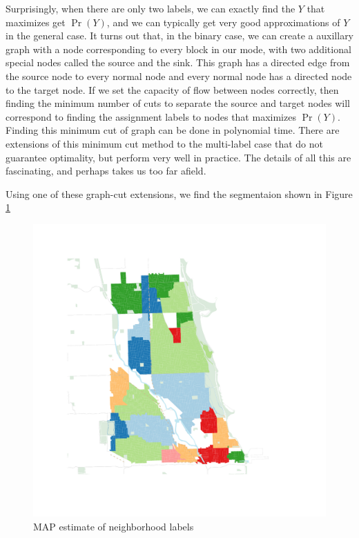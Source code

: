 \documentclass{article}
\begin{document}
Surprisingly, when there are only two labels, we can exactly find the
$Y$ that maximizes get $\Pr(Y)$, and we can typically get very good
approximations of $Y$ in the general case. It turns out that, in the
binary case, we can create a auxillary graph with a node corresponding
to every block in our mode, with two additional special nodes called
the source and the sink. This graph has a directed edge from the
source node to every normal node and every normal node has a directed
node to the target node. If we set the capacity of flow between nodes
correctly, then finding the minimum number of cuts to separate the
source and target nodes will correspond to finding the assignment
labels to nodes that maximizes $\Pr(Y)$. Finding this minimum cut of
graph can be done in polynomial time. There are extensions of this
minimum cut method to the multi-label case that do not guarantee
optimality, but perform very well in practice. The details of all this
are fascinating, and perhaps takes us too far afield.

Using one of these graph-cut extensions, we find the segmentaion shown in 
Figure \ref{fig:graphcut} 

\begin{figure}
\includegraphics{respect_grid.pdf}
\caption{MAP estimate of neighborhood labels}
\label{fig:graphcut}
\end{figure}
\end{document}
